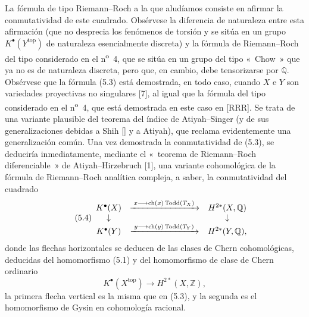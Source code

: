 La fórmula de tipo Riemann--Roch a la que aludíamos consiste en afirmar la
conmutatividad de este cuadrado. Obsérvese la diferencia de naturaleza entre
esta afirmación (que no desprecia los fenómenos de torsión y se sitúa en un
grupo $K^\bullet(Y^{\mathrm{top}})$ de naturaleza esencialmente discreta) y
la fórmula de Riemann--Roch del tipo considerado en el
n\textsuperscript{o}~4, que se sitúa en un grupo del tipo «~Chow~» que ya no
es de naturaleza discreta, pero que, en cambio, debe tensorizarse por
$\mathbb Q$. Obsérvese que la fórmula (5.3) está demostrada, en todo caso,
cuando $X$ e $Y$ son variedades proyectivas no singulares [7], al igual que
la fórmula del tipo considerado en el n\textsuperscript{o}~4, que está
demostrada en este caso en [RRR]. Se trata de una variante plausible del
teorema del índice de Atiyah--Singer (y de sus generalizaciones debidas a
Shih [] y a Atiyah), que reclama evidentemente una generalización común. Una %
vez demostrada la conmutatividad de (5.3), se deduciría inmediatamente,
mediante el «~teorema de Riemann--Roch diferenciable~» de
Atiyah--Hirzebruch [1], una variante cohomológica de la fórmula de
Riemann--Roch analítica compleja, a saber, la conmutatividad del cuadrado
\begin{equation}\tag{5.4}
\begin{array}{ccc}
K^\bullet(X) & \xrightarrow{\;x\longrightarrow \operatorname{ch}(x)\operatorname{Todd}(T_X)\;} & H^{2*}(X,\mathbb Q) \\
\downarrow && \downarrow \\
K^\bullet(Y) & \xrightarrow{\;y\longrightarrow \operatorname{ch}(y)\operatorname{Todd}(T_Y)\;} & H^{2*}(Y,\mathbb Q),
\end{array}
\end{equation}
donde las flechas horizontales se deducen de las clases de Chern
cohomológicas, deducidas del homomorfismo (5.1) y del homomorfismo de clase de
Chern ordinario
\[
K^\bullet(X^{\mathrm{top}})\longrightarrow H^{2*}(X,\mathbb Z),
\]
la primera flecha vertical es la misma que en (5.3), y la segunda es el
homomorfismo de Gysin en cohomología racional.

